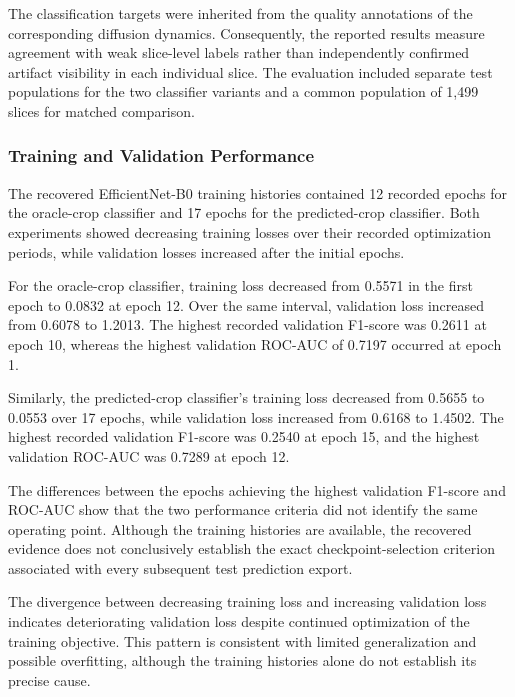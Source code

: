 The classification targets were inherited from the quality annotations of the corresponding diffusion dynamics. Consequently, the reported results measure agreement with weak slice-level labels rather than independently confirmed artifact visibility in each individual slice. The evaluation included separate test populations for the two classifier variants and a common population of 1,499 slices for matched comparison.

\subsubsection{Training and Validation Performance}
\label{subsec:results_2d_classification_training}

The recovered EfficientNet-B0 training histories contained 12 recorded epochs for the oracle-crop classifier and 17 epochs for the predicted-crop classifier. Both experiments showed decreasing training losses over their recorded optimization periods, while validation losses increased after the initial epochs.

For the oracle-crop classifier, training loss decreased from 0.5571 in the first epoch to 0.0832 at epoch 12. Over the same interval, validation loss increased from 0.6078 to 1.2013. The highest recorded validation F1-score was 0.2611 at epoch 10, whereas the highest validation ROC-AUC of 0.7197 occurred at epoch 1.

Similarly, the predicted-crop classifier's training loss decreased from 0.5655 to 0.0553 over 17 epochs, while validation loss increased from 0.6168 to 1.4502. The highest recorded validation F1-score was 0.2540 at epoch 15, and the highest validation ROC-AUC was 0.7289 at epoch 12.

The differences between the epochs achieving the highest validation F1-score and ROC-AUC show that the two performance criteria did not identify the same operating point. Although the training histories are available, the recovered evidence does not conclusively establish the exact checkpoint-selection criterion associated with every subsequent test prediction export.

The divergence between decreasing training loss and increasing validation loss indicates deteriorating validation loss despite continued optimization of the training objective. This pattern is consistent with limited generalization and possible overfitting, although the training histories alone do not establish its precise cause.


